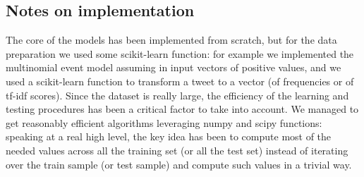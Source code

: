 \subsection*{Notes on implementation}
The core of the models has been implemented from scratch, but for the data preparation we used some scikit-learn function: for example we implemented the multinomial event model assuming in input vectors of positive values, and we used a scikit-learn function to transform a tweet to a vector (of frequencies or of tf-idf scores). Since the dataset is really large, the efficiency of the learning and testing procedures has been a critical factor to take into account. We managed to get reasonably efficient algorithms leveraging numpy and scipy functions: speaking at a real high level, the key idea has been to compute most of the needed values across all the training set (or all the test set) instead of iterating over the train sample (or test sample) and compute such values in a trivial way.
